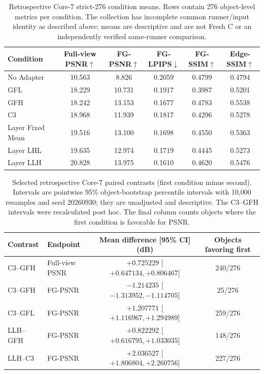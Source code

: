 \documentclass[11pt]{article}
\begin{document}
\begin{table}[ht]
\centering\scriptsize\setlength{\tabcolsep}{4pt}
\caption{Retrospective Core-7 strict-276 condition means. Rows contain 276 object-level metrics per condition. The collection has incomplete common runner/input identity as described above; means are descriptive and are not Fresh C or an independently verified same-runner comparison.}
\label{tab:supp-core7-means}
\begin{tabular}{lccccc}\toprule
Condition & Full-view PSNR$\uparrow$ & FG-PSNR$\uparrow$ & FG-LPIPS$\downarrow$ & FG-SSIM$\uparrow$ & Edge-SSIM$\uparrow$ \\
\midrule
No Adapter & 10.563 & 8.826 & 0.2059 & 0.4799 & 0.4794 \\
GFL & 18.229 & 10.731 & 0.1917 & 0.3987 & 0.5201 \\
GFH & 18.242 & 13.153 & 0.1677 & 0.4783 & 0.5538 \\
C3 & 18.968 & 11.939 & 0.1817 & 0.4296 & 0.5278 \\
Layer Fixed Mean & 19.516 & 13.100 & 0.1698 & 0.4550 & 0.5363 \\
Layer LHL & 19.635 & 12.974 & 0.1719 & 0.4445 & 0.5273 \\
Layer LLH & 20.828 & 13.975 & 0.1610 & 0.4620 & 0.5476 \\
\bottomrule\end{tabular}
\end{table}

\begin{table}[ht]
\centering\small
\caption{Selected retrospective Core-7 paired contrasts (first condition minus second). Intervals are pointwise 95\% object-bootstrap percentile intervals with 10,000 resamples and seed 20260930; they are unadjusted and descriptive. The C3--GFH intervals were recalculated post hoc. The final column counts objects where the first condition is favorable for PSNR.}
\label{tab:supp-core7-contrasts}
\begin{tabular}{llcc}\toprule
Contrast & Endpoint & Mean difference [95\% CI] (dB) & Objects favoring first \\
\midrule
C3--GFH & Full-view PSNR & $+0.725229$ [$+0.647134,+0.806467$] & 240/276 \\
C3--GFH & FG-PSNR & $-1.214235$ [$-1.313952,-1.114705$] & 25/276 \\
C3--GFL & FG-PSNR & $+1.207771$ [$+1.116967,+1.294989$] & 259/276 \\
LLH--GFH & FG-PSNR & $+0.822292$ [$+0.616795,+1.033035$] & 148/276 \\
LLH--C3 & FG-PSNR & $+2.036527$ [$+1.806804,+2.260756$] & 227/276 \\
\bottomrule\end{tabular}
\end{table}
\end{document}
